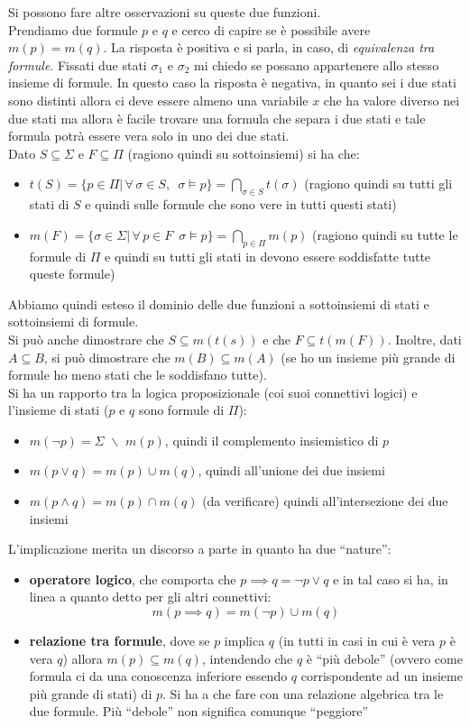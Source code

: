 \documentclass[a4paper,12pt, oneside]{book}
\begin{document}
Si possono fare altre osservazioni su queste due funzioni. \\
Prendiamo due formule $p$ e $q$ e cerco di capire se è possibile avere
$m(p)=m(q)$. La risposta è positiva e si parla, in caso, di \textit{equivalenza
  tra formule}. Fissati due stati $\sigma_1$ e $\sigma_2$ mi chiedo se possano
appartenere allo stesso insieme di formule. In questo caso la risposta è
negativa, in quanto sei i due stati sono distinti allora ci deve essere almeno
una variabile $x$ che ha valore diverso nei due stati ma allora è facile trovare
una formula che separa i due stati e tale formula potrà essere vera solo in uno
dei due stati.\\
Dato $S\subseteq \Sigma$ e $F\subseteq\Pi$ (ragiono quindi su sottoinsiemi) si
ha che:
\begin{itemize}
  \item $t(S)=\{p\in \Pi|\,\forall\,\sigma\in S,\,\,\,\sigma\vDash
  p\}=\bigcap_{\sigma\in S}t(\sigma)$ (ragiono quindi su tutti gli stati di $S$
  e quindi sulle formule che sono vere in tutti questi stati) 
  \item $m(F)=\{\sigma\in \Sigma|\,\forall\,p\in F\,\,\,\sigma\vDash
  p\}=\bigcap_{p\in \Pi}m(p)$ (ragiono quindi su tutte le formule di $\Pi$
  e quindi su tutti gli stati in devono essere soddisfatte tutte queste formule) 
\end{itemize}
Abbiamo quindi esteso il dominio delle due funzioni a sottoinsiemi di stati e
sottoinsiemi di formule.\\
Si può anche dimostrare che $S\subseteq m(t(s))$ e che $F\subseteq
t(m(F))$. Inoltre, dati $A\subseteq B$, si può dimostrare che $m(B)\subseteq
m(A)$ (se ho un insieme più grande di formule ho meno stati che le soddisfano
tutte).\\
Si ha un rapporto tra la logica proposizionale (coi suoi connettivi logici) e
l'insieme di stati ($p$ e $q$ sono formule di $\Pi$): 
\begin{itemize}
  \item $m(\neg p)=\Sigma \,\,\backslash \,\,m(p)$, quindi il complemento
  insiemistico di $p$
  \item $m(p\lor q)=m(p)\cup m(q)$, quindi all'unione dei due insiemi  
  \item $m(p\land q)=m(p)\cap m(q)$ (da verificare) quindi all'intersezione dei
  due insiemi
\end{itemize}
L'implicazione merita un discorso a parte in quanto ha due ``nature'':
\begin{itemize}
  \item \textbf{operatore logico}, che comporta che $p\implies q= \neg p\lor q$
  e in tal caso si ha, in linea a quanto detto per gli altri connettivi:
  \[m(p\implies q)= m(\neg p)\cup m(q)\]
  \item \textbf{relazione tra formule}, dove se $p$ implica $q$ (in tutti in
  casi in cui è vera $p$ è vera $q$) allora
  $m(p)\subseteq m(q)$, intendendo che $q$ è ``più debole'' (ovvero come formula
  ci da una conoscenza inferiore essendo $q$ corrispondente ad un insieme più
  grande di stati) di $p$. Si ha a che
  fare con una relazione algebrica tra le due formule. Più ``debole'' non
  significa comunque ``peggiore''
\end{itemize}
\end{document}
